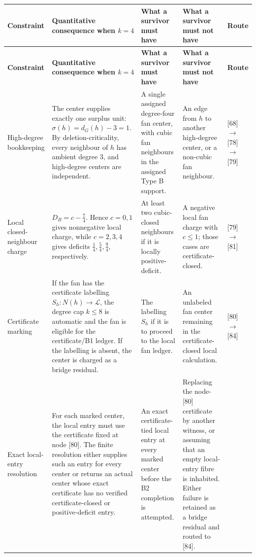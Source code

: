 \documentclass[11pt]{article}
\newcommand{\labels}{\mathcal L}
\begin{document}
{\scriptsize\setlength{\tabcolsep}{2.5pt}
\begin{longtable}{L{0.16\textwidth} L{0.19\textwidth} L{0.23\textwidth} L{0.23\textwidth} L{0.10\textwidth}}
\toprule
\textbf{Constraint} & \textbf{Quantitative consequence when \(k=4\)} &
\textbf{What a survivor must have} &
\textbf{What a survivor must not have} &
\textbf{Route}\\
\midrule
\endfirsthead
\toprule
\textbf{Constraint} & \textbf{Quantitative consequence when \(k=4\)} &
\textbf{What a survivor must have} &
\textbf{What a survivor must not have} &
\textbf{Route}\\
\midrule
\endhead
High-degree bookkeeping
&
The center supplies exactly one surplus unit:
\(\sigma(h)=d_G(h)-3=1\).  By deletion-criticality, every neighbour of \(h\)
has ambient degree \(3\), and high-degree centers are independent.
&
A single assigned degree-four fan center, with cubic fan neighbours in the
assigned Type B support.
&
An edge from \(h\) to another high-degree center, or a non-cubic fan neighbour.
&
[68]\(\to\)[78]\(\to\)[79]\\
\addlinespace
Local closed-neighbour charge
&
\(D_B=c-\frac74\).  Hence \(c=0,1\) gives nonnegative local charge, while
\(c=2,3,4\) gives deficits \(\frac14,\frac54,\frac94\), respectively.
&
At least two cubic-closed neighbours if it is locally positive-deficit.
&
A negative local fan charge with \(c\le1\); those cases are
certificate-closed.
&
[79]\(\to\)[81]\\
\addlinespace
Certificate marking
&
If the fan has the certificate labelling \(S_h:N(h)\to\labels\), the degree cap
\(k\le8\) is automatic and the fan is eligible for the certificate/B1 ledger.
If the labelling is absent, the center is charged as a bridge residual.
&
The labelling \(S_h\) if it is to proceed to the local fan ledger.
&
An unlabeled fan center remaining in the certificate-closed local calculation.
&
[80]\(\to\)[84]\\
\addlinespace
Exact local-entry resolution
&
For each marked center, the local entry must use the certificate fixed at
node [80].  The finite resolution either supplies such an entry for every
center or returns an actual center whose exact certificate has no verified
certificate-closed or positive-deficit entry.
&
An exact certificate-tied local entry at every marked center before the B2
completion is attempted.
&
Replacing the node-[80] certificate by another witness, or assuming that an
empty local-entry fibre is inhabited.  Either failure is retained as a bridge
residual and routed to [84].

\end{longtable}}
\end{document}
